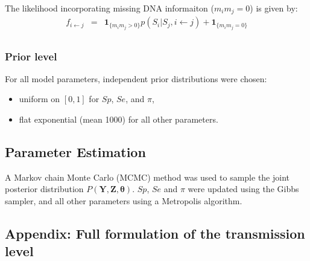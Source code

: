 \documentclass[10pt]{article}
\begin{document}

The likelihood incorporating missing DNA informaiton ($m_i m_j =0$) is given by:
\begin{eqnarray*}
f_{i \leftarrow j} & = & \mathbf{1}_{\{ m_i m_j > 0 \}} p(S_i | S_j, i \leftarrow j)
+ \mathbf{1}_{\{ m_i m_j = 0 \}}\\
\end{eqnarray*}




\subsubsection*{Prior level}


For all model parameters, independent prior distributions were chosen: 
\begin{itemize}
	\item uniform on $[0,1]$ for $Sp$, $Se$, and $\pi$, 
	\item flat exponential (mean 1000) for all other parameters. 
\end{itemize}

  
\subsection*{Parameter Estimation}

A Markov chain Monte Carlo (MCMC) method was used to sample the joint
posterior distribution $P\left(\bm{Y},\bm{Z},\bm{\theta}\right)$.
$Sp$, $Se$ and $\pi$ were updated using the Gibbs sampler, and all other parameters using a Metropolis algorithm.


\subsection*{Appendix: Full formulation of the transmission level}
\end{document}

